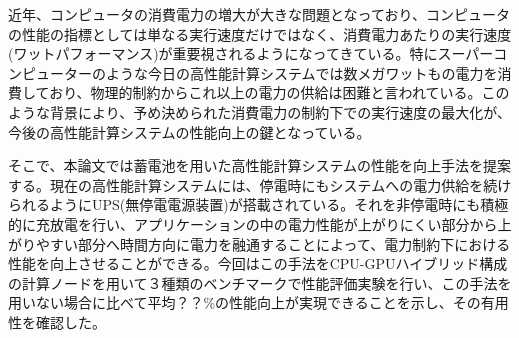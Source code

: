 近年、コンピュータの消費電力の増大が大きな問題となっており、コンピュータの性能の指標としては単なる実行速度だけではなく、消費電力あたりの実行速度(ワットパフォーマンス)が重要視されるようになってきている。特にスーパーコンピューターのような今日の高性能計算システムでは数メガワットもの電力を消費しており、物理的制約からこれ以上の電力の供給は困難と言われている。このような背景により、予め決められた消費電力の制約下での実行速度の最大化が、今後の高性能計算システムの性能向上の鍵となっている。

そこで、本論文では蓄電池を用いた高性能計算システムの性能を向上手法を提案する。現在の高性能計算システムには、停電時にもシステムへの電力供給を続けられるようにUPS(無停電電源装置)が搭載されている。それを非停電時にも積極的に充放電を行い、アプリケーションの中の電力性能が上がりにくい部分から上がりやすい部分へ時間方向に電力を融通することによって、電力制約下における性能を向上させることができる。今回はこの手法をCPU-GPUハイブリッド構成の計算ノードを用いて３種類のベンチマークで性能評価実験を行い、この手法を用いない場合に比べて平均？？\%の性能向上が実現できることを示し、その有用性を確認した。